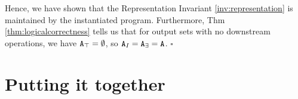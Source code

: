 \documentclass[10pt]{proc}
\newenvironment{proof}[1][Proof]{\begin{trivlist}\item[\hskip \labelsep {\textit {#1:}}]}{\end{trivlist}}
\renewcommand{\tt}[1]{\ifmmode\text{\texttt{#1}}\else\texttt{#1}\fi}
\begin{document}
\begin{proof}
Hence, we have shown that the Representation Invariant \ref{inv:representation} is maintained by the instantiated program.
Furthermore, Thm \ref{thm:logicalcorrectness} tells us that for output sets with no downstream operations, we have $\tt{A}_\top = \emptyset$, so $\tt{A}_I = \tt{A}_\exists = \tt{A}$.
$\square$
\end{proof}


\section{Putting it together}

\newpage
\balance





\end{document}
